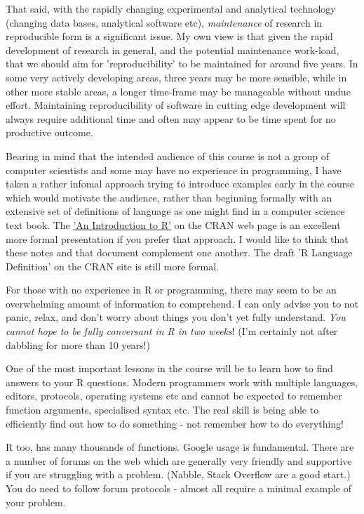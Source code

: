 \documentclass[titlepage]{book}
\begin{document}
That said, with the rapidly changing experimental and analytical technology (changing data bases, analytical software etc), \emph{maintenance} of research in reproducible form is a significant issue.  My own view is that given the rapid development of research in general, and the potential maintenance work-load, that we should aim for 'reproducibility' to be maintained for around five years. In some very actively developing areas, three years may be more sensible, while in other more stable areas, a longer time-frame may be manageable without undue effort.  Maintaining reproducibility of software in cutting edge development will always require additional time and often may appear to be time spent for no productive outcome.

Bearing in mind that the intended audience of this course is not a group of computer scientists and some may have no experience in programming, I have taken a rather infomal approach trying to introduce examples early in the course which would motivate the audience, rather than beginning formally with an extensive set of definitions of language as one might find in a computer science text book. The \href{https://cran.r-project.org/doc/manuals/r-release/R-intro.pdf}{'An Introduction to R'} on the CRAN web page is an excellent more formal presentation if you prefer that approach.  I would like to think that these notes and that document complement one another. The draft 'R Language Definition' on the CRAN site is still more formal.

For those with no experience in R or programming, there may seem to be an overwhelming amount of information to comprehend. I can only advise you to not panic, relax, and don't worry about things you don't yet fully understand.  \emph{You cannot hope to be fully conversant in R in two weeks}! (I'm certainly not after dabbling for more than 10 years!) 

One of the most important lessons in the course will be to learn how to find answers to your R questions. Modern programmers work with multiple languages, editors, protocols, operating systems etc and cannot be expected to remember function arguments, specialised syntax etc. The real skill is being able to efficiently find out how to do something -  not remember how to do everything!

R too, has many thousands of functions.  Google usage is fundamental. There are a number of forums on the web which are generally very friendly and supportive if you are struggling with a problem. (Nabble, Stack Overflow are a good start.) You do need to follow forum protocols - almost all require a minimal example of your problem.
\end{document}

